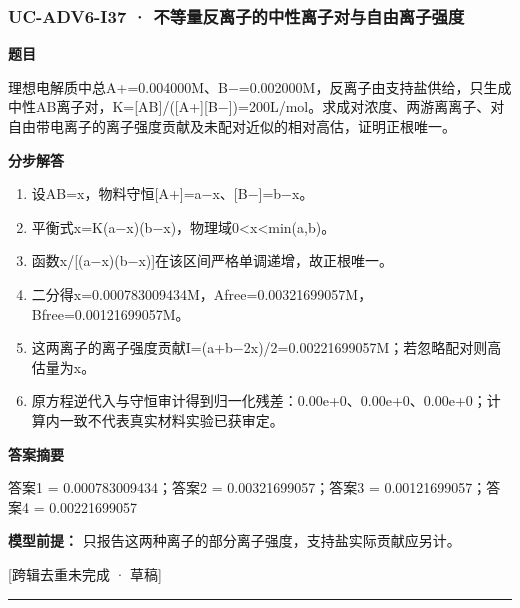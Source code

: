 \documentclass[UTF8,11pt,a4paper]{ctexart}
\begin{document}
\subsubsection*{UC-ADV6-I37 · 不等量反离子的中性离子对与自由离子强度}
\noindent\textbf{题目}\par
理想电解质中总A+=0.004000M、B−=0.002000M，反离子由支持盐供给，只生成中性AB离子对，K=[AB]/([A+][B−])=200L/mol。求成对浓度、两游离离子、对自由带电离子的离子强度贡献及未配对近似的相对高估，证明正根唯一。\par
\medskip\noindent\textbf{分步解答}
\begin{enumerate}
\item 设AB=x，物料守恒[A+]=a−x、[B−]=b−x。
\item 平衡式x=K(a−x)(b−x)，物理域0<x<min(a,b)。
\item 函数x/[(a−x)(b−x)]在该区间严格单调递增，故正根唯一。
\item 二分得x=0.000783009434M，Afree=0.00321699057M，Bfree=0.00121699057M。
\item 这两离子的离子强度贡献I=(a+b−2x)/2=0.00221699057M；若忽略配对则高估量为x。
\item 原方程逆代入与守恒审计得到归一化残差：0.00e+0、0.00e+0、0.00e+0；计算内一致不代表真实材料实验已获审定。
\end{enumerate}
\noindent\textbf{答案摘要}\par
答案1 = 0.000783009434；答案2 = 0.00321699057；答案3 = 0.00121699057；答案4 = 0.00221699057\par
\noindent\textbf{模型前提：}
只报告这两种离子的部分离子强度，支持盐实际贡献应另计。\par
\noindent\textcolor{red!65!black}{[跨辑去重未完成 · 草稿]} \par
\medskip\hrule\medskip
{}
\end{document}
